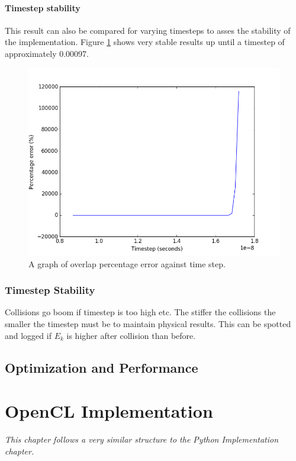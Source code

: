 \documentclass[10pt,a4paper,titlepage]{report}
\begin{document}
\subsubsection{Timestep stability}
This result can also be compared for varying timesteps to asses the stability of the implementation. Figure \ref{fig:overlap_percentage_error_against_timestep} shows very stable results up until a timestep of approximately 0.00097.
\begin{figure}[!htb]
\centering
\includegraphics[scale=0.75]{figures/ParticleBounceTimestepAgainstPercentageError.png}
\caption{A graph of overlap percentage error against time step.}
\label{fig:overlap_percentage_error_against_timestep}
\end{figure}
\subsection{Timestep Stability}
Collisions go boom if timestep is too high etc. %
The stiffer the collisions the smaller the timestep must be to maintain physical results.
This can be spotted and logged if $E_{k}$ is higher after collision than before.
\section{Optimization and Performance}
\chapter{OpenCL Implementation}
\label{ch:OpenCL Implementation}
\textit{This chapter follows a very similar structure to the Python Implementation chapter.}
\end{document}
